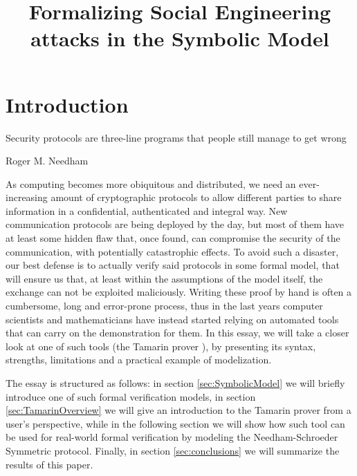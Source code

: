 \documentclass{article}
\title{Formalizing Social Engineering attacks in the Symbolic Model}
\begin{document}
\maketitle


\section*{Introduction} %


\epigraph{Security protocols are three-line programs that people still manage to get wrong}{Roger M. Needham}

As computing becomes more obiquitous and distributed, we need an ever-increasing amount of cryptographic protocols to allow different parties to share information in a confidential, authenticated and integral way. New communication protocols are being deployed by the day, but most of them have at least some hidden flaw that, once found, can compromise the security of the communication, with potentially catastrophic effects. To avoid such a disaster, our best defense is to actually verify said protocols in some formal model, that will ensure us that, at least within the assumptions of the model itself, the exchange can not be exploited maliciously. Writing these proof by hand is often a cumbersome, long and error-prone process, thus in the last years computer scientists and mathematicians have instead started relying on automated tools that can carry on the demonstration for them. In this essay, we will take a closer look at one of such tools (the Tamarin prover \cite{tamarin}), by presenting its syntax, strengths, limitations and a practical example of modelization.

The essay is structured as follows: in section \ref{sec:SymbolicModel} we will briefly introduce one of such formal verification models, in section \ref{sec:TamarinOverview} we will give an introduction to the Tamarin prover from a user's perspective, while in the following section we will show how such tool can be used for real-world formal verification by modeling the Needham-Schroeder Symmetric protocol. Finally, in section \ref{sec:conclusions} we will summarize the results of this paper.
\end{document}

